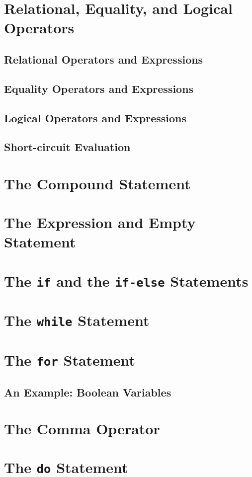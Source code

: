 \documentclass{article}
\begin{document}
\section{Relational, Equality, and Logical Operators}
\subsection{Relational Operators and Expressions}
\subsection{Equality Operators and Expressions}
\subsection{Logical Operators and Expressions}
\subsection{Short-circuit Evaluation}
\section{The Compound Statement}
\section{The Expression and Empty Statement}
\section{The \texttt{if} and the \texttt{if-else} Statements}
\section{The \texttt{while} Statement}
\section{The \texttt{for} Statement}
\subsection{An Example: Boolean Variables}
\section{The Comma Operator}
\section{The \texttt{do} Statement}
\end{document}
